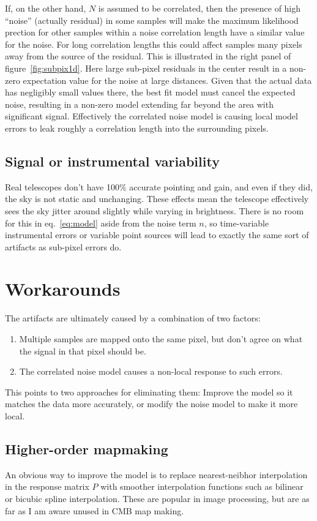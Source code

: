 \documentclass{article}
\begin{document}
If, on the other hand, $N$ is assumed to be correlated, then the presence of high
``noise'' (actually residual) in some samples
will make the maximum likelihood prection for other samples within a noise correlation length
have a similar value for the noise. For long correlation lengths this could affect samples
many pixels away from the source of the residual. This is illustrated in the right panel
of figure~\ref{fig:subpix1d}. Here large sub-pixel residuals in the center result in a non-zero expectation
value for the noise at large distances. Given that the actual data has negligibly small values
there, the best fit model must cancel the expected noise, resulting in a non-zero model
extending far beyond the area with significant signal. Effectively the correlated
noise model is causing local model errors to leak roughly a correlation length
into the surrounding pixels.

\subsection{Signal or instrumental variability}
\label{sect:inconsistency}
Real telescopes don't have 100\% accurate pointing and gain, and even if they did, the
sky is not static and unchanging. These effects mean the telescope effectively sees the
sky jitter around slightly while varying in brightness. There is no room for this in
eq.~\ref{eq:model} aside from the noise term $n$, so time-variable instrumental errors
or variable point sources will lead to exactly the same sort of artifacts as sub-pixel errors do.

\section{Workarounds}
The artifacts are ultimately caused by a combination of two factors:
\begin{enumerate}
	\item Multiple samples are mapped onto the same pixel, but don't agree on what the
		signal in that pixel should be.
	\item The correlated noise model causes a non-local response to such errors.
\end{enumerate}
This points to two approaches for eliminating them: Improve the model so it matches
the data more accurately, or modify the noise model to make it more local.

\subsection{Higher-order mapmaking}
An obvious way to improve the model is to replace nearest-neibhor interpolation in 
the response matrix $P$
with smoother interpolation functions such as bilinear or bicubic spline interpolation.
These are popular in image processing, but are as far as I am aware unused in CMB map making.
\end{document}
